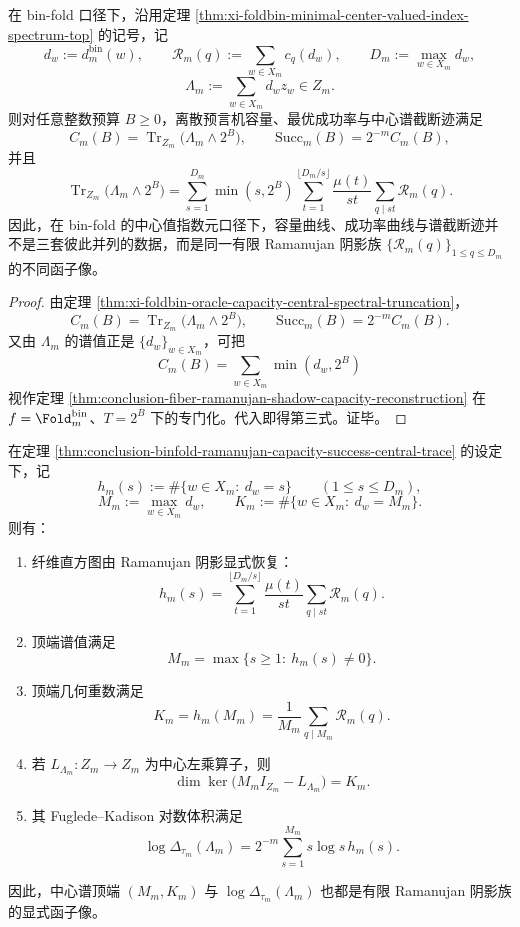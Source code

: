 \begin{theorem}\label{thm:conclusion-binfold-ramanujan-capacity-success-central-trace}
在 bin-fold 口径下，沿用定理 \ref{thm:xi-foldbin-minimal-center-valued-index-spectrum-top} 的记号，记
\[
d_w:=d_m^{\mathrm{bin}}(w),
\qquad
\mathscr R_m(q):=\sum_{w\in X_m}c_q(d_w),
\qquad
D_m:=\max_{w\in X_m}d_w,
\]
\[
\Lambda_m:=\sum_{w\in X_m}d_w z_w\in Z_m.
\]
则对任意整数预算 \(B\ge 0\)，离散预言机容量、最优成功率与中心谱截断迹满足
\[
C_m(B)=\operatorname{Tr}_{Z_m}\!\bigl(\Lambda_m\wedge 2^B\bigr),
\qquad
\mathrm{Succ}_m(B)=2^{-m}C_m(B),
\]
并且
\[
\operatorname{Tr}_{Z_m}\!\bigl(\Lambda_m\wedge 2^B\bigr)
=
\sum_{s=1}^{D_m}\min(s,2^B)
\sum_{t=1}^{\lfloor D_m/s\rfloor}
\frac{\mu(t)}{st}\sum_{q\mid st}\mathscr R_m(q).
\]
因此，在 bin-fold 的中心值指数元口径下，容量曲线、成功率曲线与谱截断迹并不是三套彼此并列的数据，而是同一有限 Ramanujan 阴影族 \(\{\mathscr R_m(q)\}_{1\le q\le D_m}\) 的不同函子像。
\end{theorem}

\begin{proof}
由定理 \ref{thm:xi-foldbin-oracle-capacity-central-spectral-truncation}，
\[
C_m(B)=\operatorname{Tr}_{Z_m}\!\bigl(\Lambda_m\wedge 2^B\bigr),
\qquad
\mathrm{Succ}_m(B)=2^{-m}C_m(B).
\]
又由 \(\Lambda_m\) 的谱值正是 \(\{d_w\}_{w\in X_m}\)，可把
\[
C_m(B)=\sum_{w\in X_m}\min(d_w,2^B)
\]
视作定理 \ref{thm:conclusion-fiber-ramanujan-shadow-capacity-reconstruction} 在 \(f=\Fold_m^{\mathrm{bin}}\)、\(T=2^B\) 下的专门化。代入即得第三式。证毕。
\end{proof}

\begin{theorem}\label{thm:conclusion-center-top-fkdet-ramanujan-reconstruction}
在定理 \ref{thm:conclusion-binfold-ramanujan-capacity-success-central-trace} 的设定下，记
\[
h_m(s):=\#\{w\in X_m:\ d_w=s\}
\qquad(1\le s\le D_m),
\]
\[
M_m:=\max_{w\in X_m}d_w,
\qquad
K_m:=\#\{w\in X_m:\ d_w=M_m\}.
\]
则有：
\begin{enumerate}
  \item 纤维直方图由 Ramanujan 阴影显式恢复：
  \[
  h_m(s)=
  \sum_{t=1}^{\lfloor D_m/s\rfloor}
  \frac{\mu(t)}{st}\sum_{q\mid st}\mathscr R_m(q).
  \]
  \item 顶端谱值满足
  \[
  M_m=\max\{s\ge 1:\ h_m(s)\neq 0\}.
  \]
  \item 顶端几何重数满足
  \[
  K_m=h_m(M_m)=\frac1{M_m}\sum_{q\mid M_m}\mathscr R_m(q).
  \]
  \item 若 \(L_{\Lambda_m}:Z_m\to Z_m\) 为中心左乘算子，则
  \[
  \dim\ker\!\bigl(M_mI_{Z_m}-L_{\Lambda_m}\bigr)=K_m.
  \]
  \item 其 Fuglede--Kadison 对数体积满足
  \[
  \log\Delta_{\tau_m}(\Lambda_m)
  =
  2^{-m}\sum_{s=1}^{M_m}s\log s\,h_m(s).
  \]
\end{enumerate}
因此，中心谱顶端 \((M_m,K_m)\) 与 \(\log\Delta_{\tau_m}(\Lambda_m)\) 也都是有限 Ramanujan 阴影族的显式函子像。
\end{theorem}

